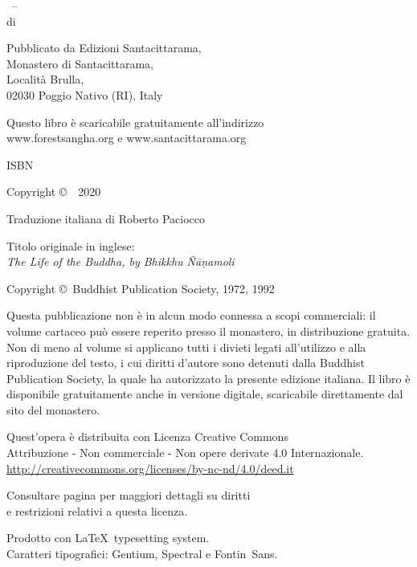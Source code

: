 \cleartoverso
\thispagestyle{empty}

{\copyrightsize
\centering
\setlength{\parindent}{0pt}%
\setlength{\parskip}{0.8\baselineskip}%

\thetitle\ -- \thesubtitle\\
di \theauthor

Pubblicato da Edizioni Santacittarama,\\
Monastero di Santacittarama,\\
Località Brulla,\\
02030 Poggio Nativo (RI), Italy

Questo libro è scaricabile gratuitamente all'indirizzo\\
www.forestsangha.org e www.santacittarama.org

ISBN \theISBN

\theEditionInfo

Copyright \copyright\ \thePublisher\ 2020

Traduzione italiana di Roberto Paciocco

Titolo originale in inglese:\\
\emph{The Life of the Buddha, by Bhikkhu Ñāṇamoli}

Copyright \copyright\ Buddhist Publication Society, 1972, 1992

\vfill


Questa pubblicazione non è in alcun modo connessa a scopi commerciali: il volume
cartaceo può essere reperito presso il monastero, in distribuzione gratuita. Non
di meno al volume si applicano tutti i divieti legati all’utilizzo e alla
riproduzione del testo, i cui diritti d’autore sono detenuti dalla Buddhist
Publication Society, la quale ha autorizzato la presente edizione italiana. Il
libro è disponibile gratuitamente anche in versione digitale, scaricabile
direttamente dal sito del monastero.

\vfill

{\footnotesize
Quest'opera è distribuita con Licenza Creative Commons\\
Attribuzione - Non commerciale - Non opere derivate 4.0 Internazionale.\\
\href{http://creativecommons.org/licenses/by-nc-nd/4.0/deed.it}{http://creativecommons.org/licenses/by-nc-nd/4.0/deed.it}

Consultare pagina \pageref{copyright-details} per maggiori dettagli su diritti\\ e restrizioni relativi a questa licenza.

Prodotto con \LaTeX\ typesetting system.\\ Caratteri tipografici: Gentium, Spectral e Fontin~Sans.

}}
